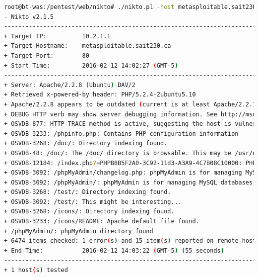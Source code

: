 \documentclass{article}
\begin{document}
\begin{lstlisting}[language=Bash]
root@bt-was:/pentest/web/nikto# ./nikto.pl -host metasploitable.sait230.ca -p 80
- Nikto v2.1.5
---------------------------------------------------------------------------
+ Target IP:          10.2.1.1
+ Target Hostname:    metasploitable.sait230.ca
+ Target Port:        80
+ Start Time:         2016-02-12 14:02:27 (GMT-5)
---------------------------------------------------------------------------
+ Server: Apache/2.2.8 (Ubuntu) DAV/2
+ Retrieved x-powered-by header: PHP/5.2.4-2ubuntu5.10
+ Apache/2.2.8 appears to be outdated (current is at least Apache/2.2.19). Apache 1.3.42 (final release) and 2.0.64 are also current.
+ DEBUG HTTP verb may show server debugging information. See http://msdn.microsoft.com/en-us/library/e8z01xdh%28VS.80%29.aspx for details.
+ OSVDB-877: HTTP TRACE method is active, suggesting the host is vulnerable to XST
+ OSVDB-3233: /phpinfo.php: Contains PHP configuration information
+ OSVDB-3268: /doc/: Directory indexing found.
+ OSVDB-48: /doc/: The /doc/ directory is browsable. This may be /usr/doc.
+ OSVDB-12184: /index.php?=PHPB8B5F2A0-3C92-11d3-A3A9-4C7B08C10000: PHP reveals potentially sensitive information via certain HTTP requests that contain specific QUERY strings.
+ OSVDB-3092: /phpMyAdmin/changelog.php: phpMyAdmin is for managing MySQL databases, and should be protected or limited to authorized hosts.
+ OSVDB-3092: /phpMyAdmin/: phpMyAdmin is for managing MySQL databases, and should be protected or limited to authorized hosts.
+ OSVDB-3268: /test/: Directory indexing found.
+ OSVDB-3092: /test/: This might be interesting...
+ OSVDB-3268: /icons/: Directory indexing found.
+ OSVDB-3233: /icons/README: Apache default file found.
+ /phpMyAdmin/: phpMyAdmin directory found
+ 6474 items checked: 1 error(s) and 15 item(s) reported on remote host
+ End Time:           2016-02-12 14:03:22 (GMT-5) (55 seconds)
---------------------------------------------------------------------------
+ 1 host(s) tested
\end{lstlisting}
\end{document}
